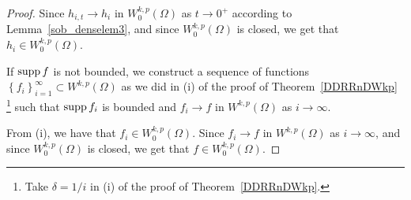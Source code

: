 \begin{proof}
Since $h_{i,t} \to h_i$ in $\displaystyle W^{k,p}_0(\Omega)$ as $t \to 0^+$
according to Lemma~\ref{sob_denselem3}, and since 
$\displaystyle W^{k,p}_0(\Omega)$ is closed, we get that
$\displaystyle h_i \in W^{k,p}_0(\Omega)$.

  If $\operatorname{supp} f$ is not bounded, we construct a sequence of functions
$\displaystyle \left\{ f_i \right\}_{i=1}^\infty \subset W^{k,p}(\Omega)$
as we did in (i) of the proof of Theorem~\ref{DDRRnDWkp}
\footnote{Take $\delta = 1/i$ in (i) of the proof of Theorem~\ref{DDRRnDWkp}.}
such that $\operatorname{supp} f_i$ is bounded and
$f_i \to f$ in $\displaystyle W^{k,p}(\Omega)$ as $i \to \infty$.

From (i), we have that $\displaystyle f_i \in W^{k,p}_0(\Omega)$.  Since
$f_i \to f$ in $\displaystyle W^{k,p}(\Omega)$ as $i \to \infty$, and since 
$\displaystyle W^{k,p}_0(\Omega)$ is closed, we get that
$\displaystyle f \in W^{k,p}_0(\Omega)$.
\end{proof}

